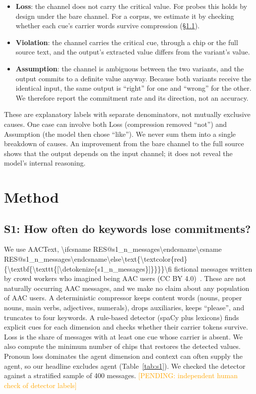 \documentclass{ceurart}
\makeatletter
\newcommand{\RES}[1]{\ifcsname RES@#1\endcsname\csname RES@#1\endcsname\else\RESmissing{#1}\fi}
\newcommand{\RESmissing}[1]{\text{\textcolor{red}{\textbf{\texttt{[\detokenize{#1}]}}}}}
\newcommand{\say}[1]{``#1''}
\newcommand{\pending}[1]{\textcolor{orange}{[PENDING: #1]}}
\makeatother
\begin{document}
\begin{itemize}
\item \textbf{Loss}: the channel does not carry the critical value. For probes this holds by design under the bare channel. For a corpus, we estimate it by checking whether each cue's carrier words survive compression (\S\ref{sec:s1}).
\item \textbf{Violation}: the channel carries the critical cue, through a chip or the full source text, and the output's extracted value differs from the variant's value.
\item \textbf{Assumption}: the channel is ambiguous between the two variants, and the output commits to a definite value anyway. Because both variants receive the identical input, the same output is ``right'' for one and ``wrong'' for the other. We therefore report the commitment rate and its direction, not an accuracy.
\end{itemize}

These are explanatory labels with separate denominators, not mutually exclusive causes.
One case can involve both Loss (compression removed \say{not}) and Assumption (the model then chose \say{like}).
We never sum them into a single breakdown of causes.
An improvement from the bare channel to the full source shows that the output depends on the input channel; it does not reveal the model's internal reasoning.

\section{Method}

\subsection{S1: How often do keywords lose commitments?}
\label{sec:s1}
We use AACText, \num{\RES{s1_n_messages}} fictional messages written by crowd workers who imagined being AAC users (CC BY 4.0)~\cite{vertanen2011imagination}. %
These are not naturally occurring AAC messages, and we make no claim about any population of AAC users.
A deterministic compressor keeps content words (nouns, proper nouns, main verbs, adjectives, numerals), drops auxiliaries, keeps \say{please}, and truncates to four keywords.
A rule-based detector (spaCy plus lexicons) finds explicit cues for each dimension and checks whether their carrier tokens survive.
Loss is the share of messages with at least one cue whose carrier is absent.
We also compute the minimum number of chips that restores the detected values. Pronoun loss dominates the agent dimension and context can often supply the agent, so our headline excludes agent (Table~\ref{tab:s1}).
We checked the detector against a stratified sample of 400 messages. \pending{independent human check of detector labels} %
\end{document}
